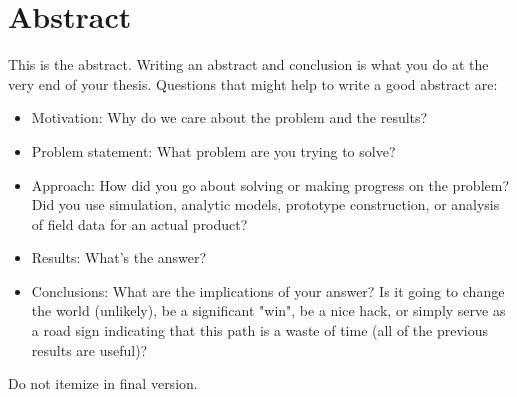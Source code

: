
\chapter*{Abstract}
This is the abstract.
Writing an abstract and conclusion is what you do at the very end of your thesis. 
Questions that might help to write a good abstract are:
	
	\begin{itemize}
		\item Motivation: Why do we care about the problem and the results?
		\item Problem statement: What problem are you trying to solve?
		\item Approach: How did you go about solving or making progress on the problem? Did you use simulation, analytic models, prototype construction, or analysis of field data for an actual product?
		\item Results: What's the answer?
		\item Conclusions: What are the implications of your answer? Is it going to change the world (unlikely), be a significant "win", be a nice hack, or simply serve as a road sign indicating that this path is a waste of time (all of the previous results are useful)? 		
	\end{itemize}

Do not itemize in final version.

	
